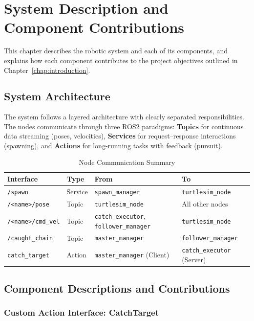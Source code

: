 \chapter{System Description and Component Contributions\label{chap:system}}

This chapter describes the robotic system and each of its components, and explains how each component contributes to the project objectives outlined in Chapter~\ref{chap:introduction}.

\section{System Architecture}

The system follows a layered architecture with clearly separated responsibilities. The nodes communicate through three ROS2 paradigms: \textbf{Topics} for continuous data streaming (poses, velocities), \textbf{Services} for request--response interactions (spawning), and \textbf{Actions} for long-running tasks with feedback (pursuit).

\begin{table}[htbp]
\centering
\caption{Node Communication Summary}
\label{tab:communication}
\begin{tabular}{llll}
\toprule
\textbf{Interface} & \textbf{Type} & \textbf{From} & \textbf{To} \\
\midrule
\texttt{/spawn} & Service & \texttt{spawn\_manager} & \texttt{turtlesim\_node} \\
\texttt{/<name>/pose} & Topic & \texttt{turtlesim\_node} & All other nodes \\
\texttt{/<name>/cmd\_vel} & Topic & \texttt{catch\_executor}, \texttt{follower\_manager} & \texttt{turtlesim\_node} \\
\texttt{/caught\_chain} & Topic & \texttt{master\_manager} & \texttt{follower\_manager} \\
\texttt{catch\_target} & Action & \texttt{master\_manager} (Client) & \texttt{catch\_executor} (Server) \\
\bottomrule
\end{tabular}
\end{table}

\section{Component Descriptions and Contributions}

\subsection{Custom Action Interface: CatchTarget}

